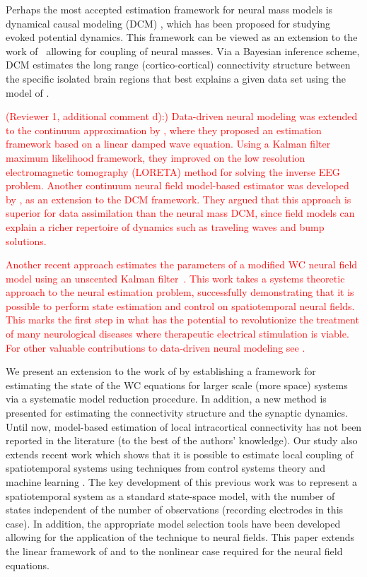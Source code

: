 \documentclass[review,authoryear,3p]{elsarticle}
\newcommand{\dean}[1]{\textcolor{red}{#1}}
\begin{document}
Perhaps the most accepted estimation framework for neural mass models is dynamical causal modeling (DCM) \citep{David2003,David2006}, which has been proposed for studying evoked potential dynamics. This framework can be viewed as an extension to the work of~\citet{Valdes1999} allowing for coupling of neural masses. Via a Bayesian inference scheme, DCM estimates the long range (cortico-cortical) connectivity structure between the specific isolated brain regions that best explains a given data set using the model of \citet{Jansen1995}.

\dean{(Reviewer 1, additional comment d):) Data-driven neural modeling was extended to the continuum approximation by \citet{Galka2008}, where they proposed an estimation framework based on a linear damped wave equation. Using a Kalman filter maximum likelihood framework, they improved on the low resolution electromagnetic tomography (LORETA) method for solving the inverse EEG problem. Another continuum neural field model-based estimator was developed by \citet{Daunizeau2009}, as an extension to the DCM framework. They argued that this approach is superior for data assimilation than the neural mass DCM, since field models can explain a richer repertoire of dynamics such as traveling waves and bump solutions.}   

\dean{Another recent approach estimates the parameters of a modified WC neural field model using an unscented Kalman filter~\citep{schiff2008kalman}. This work takes a systems theoretic approach to the neural estimation problem, successfully demonstrating that it is possible to perform state estimation and control on spatiotemporal neural fields. This marks the first step in what has the potential to revolutionize the treatment of many neurological diseases where therapeutic electrical stimulation is viable. For other valuable contributions to data-driven neural modeling see \citet{Nunez2000,Jirsa2002,Robinson2004}.}

We present an extension to the work of \citet{schiff2008kalman} by establishing a framework for estimating the state of the WC equations for larger scale (more space) systems via a systematic model reduction procedure. In addition, a new method is presented for estimating the connectivity structure and the synaptic dynamics. Until now, model-based estimation of local intracortical connectivity has not been reported in the literature (to the best of the authors' knowledge). Our study also extends recent work which shows that it is possible to estimate local coupling of spatiotemporal systems using techniques from control systems theory and machine learning \citep{Dewar2009}. The key development of this previous work was to represent a spatiotemporal system as a standard state-space model, with the number of states independent of the number of observations (recording electrodes in this case). In addition, the appropriate model selection tools have been developed \citep{Scerri2009} allowing for the application of the technique to neural fields. This paper extends the linear framework of \citet{Dewar2009} and \citet{Scerri2009} to the nonlinear case required for the neural field equations. 
\end{document}
